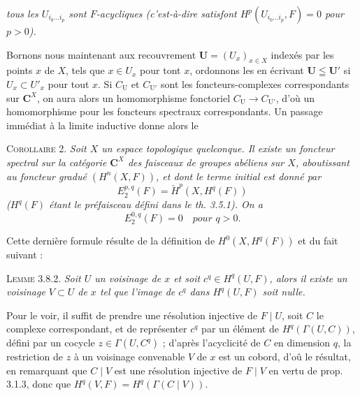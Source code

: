 
\noindent\textit{tous les $U_{i_0\ldots i_p}$ sont $F$-acycliques
\textup{(}c'est-à-dire satisfont $H^p(U_{i_0\ldots i_p},F)=0$ pour $p>0$\textup{)}.}

Bornons nous maintenant aux recouvrement
$\mathbf U=(U_x)_{x\in X}$ indexés par les points $x$ de $X$, tels que
$x\in U_x$ pour tont $x$, ordonnons les en écrivant
$\mathbf U\leqq\mathbf U'$ si $U_x\subset U'_x$ pour tout $x$.
Si $C_{\mathrm U}$ et $C_{\mathrm U'}$ sont les foncteurs-complexes
correspondants sur $\mathbf C^X$, on aura alors un homomorphisme fonctoriel
$C_{\mathrm U}\to C_{\mathrm U'}$, d'où un homomorphisme pour
les foncteurs spectraux correspondants. Un passage immédiat à la limite
inductive donne alors le

\textsc{Corollaire 2.} \textit{Soit $X$ un espace topologique
quelconque. Il existe un foncteur spectral sur la catégorie $\mathbf C^X$ des faisceaux
de groupes abéliens sur $X$, aboutissant au foncteur gradué $(H^n(X,F))$, et
dont le terme initial est donné par}
\[
E_2^{p,q}(F)=\check H^p(X,H^q(F))
\]
\textit{\textup{(}$H^q(F)$ étant le préfaisceau défini dans le th. \textup{3.5.1)}. On a}
\[
E_2^{0,q}(F)=0\quad\textit{pour }q>0.
\]

Cette dernière formule résulte de la définition de
$H^0(X,H^q(F))$ et du fait suivant :

\textsc{Lemme 3.8.2.} \textit{Soit $U$ un voisinage de $x$ et
soit $c^q\in H^q(U,F)$, alors il existe un voisinage $V\subset U$ de $x$ tel
que l'image de $c^q$ dans $H^q(U,F)$ soit nulle.}

Pour le voir, il suffit de prendre une résolution injective de $F\mid U$, soit
$C$ le complexe correspondant, et de représenter $c^q$ par un élément de
$H^q(\Gamma(U,C))$, défini par un cocycle $z\in\Gamma(U,C^q)$ ; d'après
l'acyclicité de $C$ en dimension $q$, la restriction de $z$ à un voisinage
convenable $V$ de $x$ est un cobord, d'oû le résultat, en remarquant que
$C\mid V$ est une résolution injective de $F\mid V$ en vertu de prop. 3.1.3,
donc que $H^q(V,F)=H^q(\Gamma(C\mid V))$.

